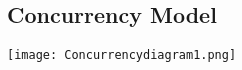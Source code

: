 \begin{landscape}
\chapter{Concurrency Model}
\thispagestyle{empty}

\texttt{[image: Concurrencydiagram1.png]}
\end{landscape}